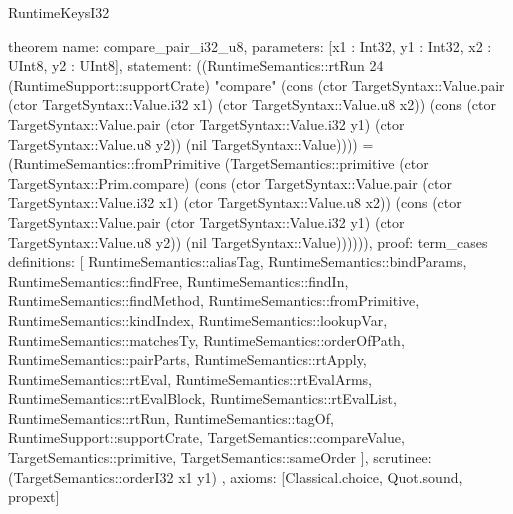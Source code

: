 \begin{lexlean}{RuntimeKeysI32}
\begin{semanticmodule}
theorem{
  name: compare_pair_i32_u8,
  parameters: [x1 : Int32, y1 : Int32, x2 : UInt8, y2 : UInt8],
  statement: ((RuntimeSemantics::rtRun 24 (RuntimeSupport::supportCrate) "compare" (cons (ctor TargetSyntax::Value.pair (ctor TargetSyntax::Value.i32 x1) (ctor TargetSyntax::Value.u8 x2)) (cons (ctor TargetSyntax::Value.pair (ctor TargetSyntax::Value.i32 y1) (ctor TargetSyntax::Value.u8 y2)) (nil TargetSyntax::Value)))) = (RuntimeSemantics::fromPrimitive (TargetSemantics::primitive (ctor TargetSyntax::Prim.compare) (cons (ctor TargetSyntax::Value.pair (ctor TargetSyntax::Value.i32 x1) (ctor TargetSyntax::Value.u8 x2)) (cons (ctor TargetSyntax::Value.pair (ctor TargetSyntax::Value.i32 y1) (ctor TargetSyntax::Value.u8 y2)) (nil TargetSyntax::Value)))))),
  proof: term_cases{
    definitions: [
      RuntimeSemantics::aliasTag,
      RuntimeSemantics::bindParams,
      RuntimeSemantics::findFree,
      RuntimeSemantics::findIn,
      RuntimeSemantics::findMethod,
      RuntimeSemantics::fromPrimitive,
      RuntimeSemantics::kindIndex,
      RuntimeSemantics::lookupVar,
      RuntimeSemantics::matchesTy,
      RuntimeSemantics::orderOfPath,
      RuntimeSemantics::pairParts,
      RuntimeSemantics::rtApply,
      RuntimeSemantics::rtEval,
      RuntimeSemantics::rtEvalArms,
      RuntimeSemantics::rtEvalBlock,
      RuntimeSemantics::rtEvalList,
      RuntimeSemantics::rtRun,
      RuntimeSemantics::tagOf,
      RuntimeSupport::supportCrate,
      TargetSemantics::compareValue,
      TargetSemantics::primitive,
      TargetSemantics::sameOrder
    ],
    scrutinee: (TargetSemantics::orderI32 x1 y1)
  },
  axioms: [Classical.choice, Quot.sound, propext]
}


\end{semanticmodule}
\end{lexlean}
